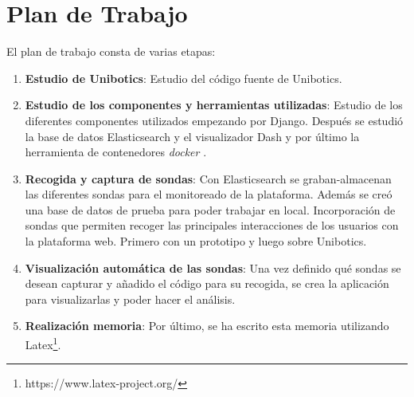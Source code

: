 \section{Plan de Trabajo}
El plan de trabajo consta de varias etapas:

\begin{enumerate}
\item \textbf{Estudio de Unibotics}: Estudio del código fuente de Unibotics.
\item \textbf{Estudio de los componentes y herramientas utilizadas}: Estudio de los diferentes componentes utilizados empezando por Django. Después se estudió la base de datos Elasticsearch y el visualizador Dash y por último la herramienta de contenedores \textit{docker} .
\item \textbf{Recogida y captura de sondas}: Con Elasticsearch se graban-almacenan las diferentes sondas para el monitoreado de la plataforma. Además se creó una base de datos de prueba para poder trabajar en local. Incorporación de sondas que permiten recoger las principales interacciones de los usuarios con la plataforma web. Primero con un prototipo y luego sobre Unibotics.
\item \textbf{Visualización automática de las sondas}: Una vez definido qué sondas se desean capturar y añadido el código para su recogida, se crea la aplicación para visualizarlas y poder hacer el análisis.
\item \textbf{Realización memoria}: Por último, se ha escrito esta memoria utilizando Latex\footnote{https://www.latex-project.org/}.
\end{enumerate}








